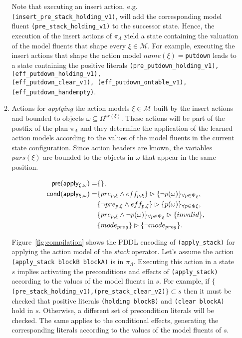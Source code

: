 \documentclass[runningheads]{llncs}
\newcommand{\pre}{\mathsf{pre}}     %
\newcommand{\cond}{\mathsf{cond}}   %
\begin{document}
\begin{itemize}
\begin{enumerate}
\vspace{0.1cm}

Note that executing an insert action, e.g.{\tt{\small (insert\_pre\_stack\_holding\_v1)}}, will add the corresponding model fluent {\tt{\small (pre\_stack\_holding\_v1)}} to the successor state. Hence, the execution of the insert actions of $\pi_\Lambda$ yield a state containing the valuation of the model fluents that shape every $\xi \in \mathcal{M}$. For example, executing the insert actions that shape the action model $name(\xi)=${\tt{\small putdown}} leads to a state containing the positive literals {\tt{\small (pre\_putdown\_holding\_v1),(eff\_putdown\_holding\_v1),\\ (eff\_putdown\_clear\_v1),
(eff\_putdown\_ontable\_v1),(eff\_putdown\_handempty)}}.

\item Actions for {\em applying} the action models $\xi\in\mathcal{M}$ built by the insert actions and bounded to objects $\omega\subseteq\Omega^{ar(\xi)}$. These actions will be part of the postfix of the plan $\pi_\Lambda$ and they determine the application of the learned action models according to the values of the model fluents in the current state configuration. Since action headers are known, the variables $pars(\xi)$ are bounded to the objects in $\omega$ that appear in the same position.

\begin{small}
\begin{align*}
\hspace*{7pt}\pre(\mathsf{apply_{\xi,\omega}})=&\{\},\\
\cond(\mathsf{apply_{\xi,\omega}})=& \{pre_{p,\xi}\wedge eff_{p,\xi}\}\rhd\{\neg p(\omega)\}_{\forall p\in\Psi_\xi},\\
& \{\neg pre_{p,\xi}\wedge eff_{p,\xi}\}\rhd\{p(\omega)\}_{\forall p\in\Psi\xi},\\
& \{pre_{p,\xi}\wedge \neg p(\omega)\}_{\forall p\in\Psi_\xi}\rhd\{invalid\},\\
&\{mode_{prog}\}\rhd\{\neg mode_{prog}\}.
\end{align*}
\end{small}

Figure~\ref{fig:compilation} shows the PDDL encoding of {\tt{\small (apply\_stack)}} for applying the action model of the {\em stack} operator. Let's assume the action {\tt{\small (apply\_stack blockB blockA)}} is in $\pi_\Lambda$. Executing this action in a state $s$ implies activating the preconditions and effects of {\tt{\small (apply\_stack)}} according to the values of the model fluents in $s$. For example, if  $\{${\tt{\small (pre\_stack\_holding\_v1),(pre\_stack\_clear\_v2)}}$\} \subset s$ then it must be checked that positive literals {\tt{\small (holding blockB)}} and {\tt{\small (clear blockA)}} hold in $s$. Otherwise, a different set of precondition literals will be checked. The same applies to the conditional effects, generating the corresponding literals according to the values of the model fluents of $s$.


\end{enumerate}
\end{itemize}
\end{document}
